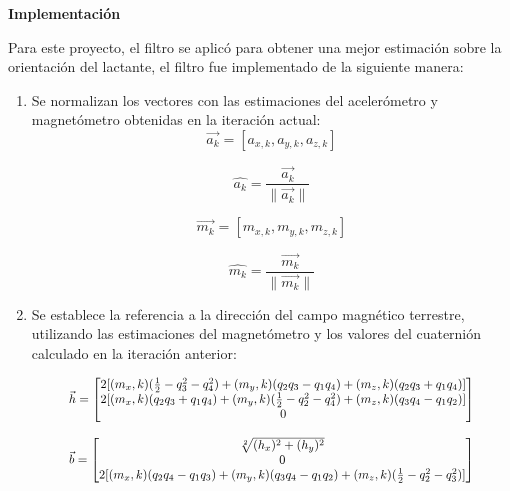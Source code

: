 \documentclass[conference]{IEEEtran}
\providecommand{\norm}[1]{\lVert#1\rVert}
\begin{document}
    \textbf{Implementación}

    Para este proyecto, el filtro se aplicó para obtener una mejor estimación sobre la orientación del lactante, el filtro fue implementado de la siguiente manera:

    \begin{enumerate}
        \item Se normalizan los vectores con las estimaciones del acelerómetro y magnetómetro obtenidas en la iteración actual:
        \begin{equation}
             \vec{a_k} = [a_{x,k}, a_{y,k}, a_{z,k}]  
        \end{equation}

        \begin{equation}
            \hat{a_k} = \frac{\vec{a_k}}{\norm{\vec{a_k}}}  
        \end{equation}

        \begin{equation}
            \vec{m_k} = [m_{x,k}, m_{y,k}, m_{z,k}] 
        \end{equation}

        \begin{equation}
            \hat{m_k} = \frac{\vec{m_k}}{\norm{\vec{m_k}}} 
        \end{equation}
            
        
        \item Se establece la referencia a la dirección del campo magnético terrestre, utilizando las estimaciones del magnetómetro y los valores del cuaternión calculado en la iteración anterior:
        
        \begin{equation}
            \resizebox{0.84\hsize}{!}{$
            \vec{h} = 
                \begin{bmatrix}
                    2[(m_x,k)(\frac{1}{2} - q^2_3 - q^2_4 ) + (m_y,k)(q_2q_3 - q_1q_4) + (m_z,k)(q_2q_3 + q_1q_4)] \\
                    2[(m_x,k)(q_2q_3 + q_1q_4) + (m_y,k)(\frac{1}{2} - q^2_2 - q^2_4 ) + (m_z,k)(q_3q_4 - q_1q_2)] \\
                    0 
                \end{bmatrix} 
            $}    
        \end{equation}
        
        
        \begin{equation}
        \resizebox{0.84\hsize}{!}{$
            \vec{b} = 
                \begin{bmatrix}
                    \sqrt[2]{(h_x)^2+(h_y)^2}  \\
                    0 \\
                    2[(m_x,k)(q_2q_4 - q_1q_3) + (m_y,k)(q_3q_4 - q_1q_2) + (m_z,k)(\frac{1}{2} - q^2_2 - q^2_3 )] 
                \end{bmatrix} 
            $}
        \end{equation}
            

\end{enumerate}
\end{document}

